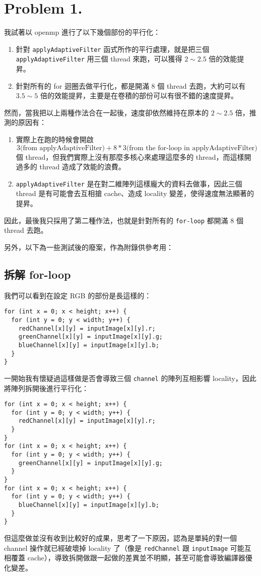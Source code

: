 \documentclass[12pt, a4paper]{article}
\newcommand{\documentname}{HW1 - Report}
\begin{document}
\pagestyle{fancy}
\fancyfoot[C]{\thepage}
\fancyhead[L]{\documentname}
\section*{Problem 1.}
我試著以 openmp 進行了以下幾個部份的平行化：
\begin{enumerate}
  \item 針對 \lstinline{applyAdaptiveFilter} 函式所作的平行處理，就是把三個 \lstinline{applyAdaptiveFilter} 用三個 thread 來跑，可以獲得 $2\sim2.5$ 倍的效能提昇。
  \item 針對所有的 for 迴圈去做平行化，都是開滿 8 個 thread 去跑，大約可以有 $3.5\sim5$ 倍的效能提昇，主要是在卷積的部份可以有很不錯的速度提昇。
\end{enumerate}

然而，當我把以上兩種作法合在一起後，速度卻依然維持在原本的 $2\sim2.5$ 倍，推測的原因有：
\begin{enumerate}
  \item 實際上在跑的時候會開啟
    $$3\text{(from applyAdaptiveFilter)} + 8*3\text{(from the for-loop in applyAdaptiveFilter)}$$
    個 thread，但我們實際上沒有那麼多核心來處理這麼多的 thread，而這樣開過多的 thread 造成了效能的浪費。
  \item \lstinline{applyAdaptiveFilter} 是在對二維陣列這樣龐大的資料去做事，因此三個 thread 是有可能會去互相搶 cache、造成 locality 變差，使得速度無法顯著的提昇。
\end{enumerate}

因此，最後我只採用了第二種作法，也就是針對所有的 \lstinline{for-loop} 都開滿 8 個 thread 去跑。

另外，以下為一些測試後的廢案，作為附錄供參考用：
\subsection*{拆解 for-loop}
我們可以看到在設定 RGB 的部份是長這樣的：
\begin{lstlisting}
for (int x = 0; x < height; x++) {
  for (int y = 0; y < width; y++) {
    redChannel[x][y] = inputImage[x][y].r;
    greenChannel[x][y] = inputImage[x][y].g;
    blueChannel[x][y] = inputImage[x][y].b;
  }
}
\end{lstlisting}
一開始我有懷疑過這樣做是否會導致三個 \lstinline{channel} 的陣列互相影響 locality，因此將陣列拆開後進行平行化：
\begin{lstlisting}
for (int x = 0; x < height; x++) {
  for (int y = 0; y < width; y++) {
    redChannel[x][y] = inputImage[x][y].r;
  }
}
for (int x = 0; x < height; x++) {
  for (int y = 0; y < width; y++) {
    greenChannel[x][y] = inputImage[x][y].g;
  }
}
for (int x = 0; x < height; x++) {
  for (int y = 0; y < width; y++) {
    blueChannel[x][y] = inputImage[x][y].b;
  }
}
\end{lstlisting}
但這麼做並沒有收到比較好的成果，思考了一下原因，認為是單純的對一個 channel 操作就已經破壞掉 locality 了（像是 \lstinline{redChannel} 跟 \lstinline{inputImage} 可能互相覆蓋 cache），導致拆開做跟一起做的差異並不明顯，甚至可能會導致編譯器優化變差。
\end{document}
